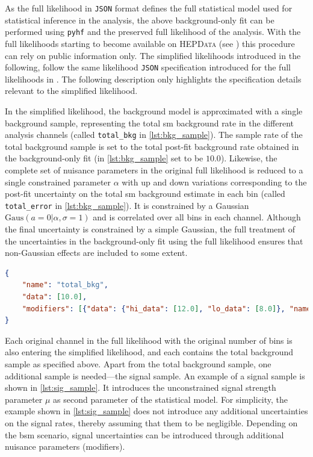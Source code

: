 As the full likelihood in \texttt{JSON} format defines the full statistical model used for statistical inference in the analysis, the above background-only fit can be performed using \texttt{pyhf} and the preserved full likelihood of the analysis. With the full likelihoods starting to become available on \textsc{HEPData} (see \eg {}\cite{fullLH_1Lbb}) this procedure can rely on public information only. The simplified likelihoods introduced in the following, follow the same likelihood \texttt{JSON} specification introduced for the full likelihoods in \cite{ATL-PHYS-PUB-2019-029}. The following description only highlights the specification details relevant to the simplified likelihood. 

In the simplified likelihood, the background model is approximated with a single background sample, representing the total \gls{sm} background rate in the different analysis channels (called \texttt{total\_bkg} in \cref{lst:bkg_sample}). The sample rate of the total background sample is set to the total post-fit background rate obtained in the background-only fit (in \cref{lst:bkg_sample} set to be $10.0$). Likewise, the complete set of nuisance parameters in the original full likelihood is reduced to a single constrained parameter $\alpha$ with up and down variations corresponding to the post-fit uncertainty on the total \gls{sm} background estimate in each bin (called \texttt{total\_error} in \cref{lst:bkg_sample}). It is constrained by a Gaussian $\mathrm{Gaus}(a = 0 \vert \alpha , \sigma = 1)$ and is correlated over all bins in each channel. Although the final uncertainty is constrained by a simple Gaussian, the full treatment of the uncertainties in the background-only fit using the full likelihood ensures that non-Gaussian effects are included to some extent.

\begin{minipage}{\linewidth}
\begin{lstlisting}[language=json,firstnumber=1,caption={Example of a total background sample with sample rate and total uncertainty as derived from a previous fit in the \glspl{sr} and \glspl{cr}.},captionpos=b, label=lst:bkg_sample]
{
	"name": "total_bkg",
	"data": [10.0],
	"modifiers": [{"data": {"hi_data": [12.0], "lo_data": [8.0]}, "name": "total_error", "type": "histosys"}]
}
\end{lstlisting}
\end{minipage}

Each original channel in the full likelihood with the original number of bins is also entering the simplified likelihood, and each contains the total background sample as specified above. Apart from the total background sample, one additional sample is needed---the signal sample. An example of a signal sample is shown in \cref{lst:sig_sample}. It introduces the unconstrained signal strength parameter $\mu$ as second parameter of the statistical model. For simplicity, the example shown in \cref{lst:sig_sample} does not introduce any additional uncertainties on the signal rates, thereby assuming that them to be negligible. Depending on the \gls{bsm} scenario, signal uncertainties can be introduced through additional nuisance parameters (modifiers).


